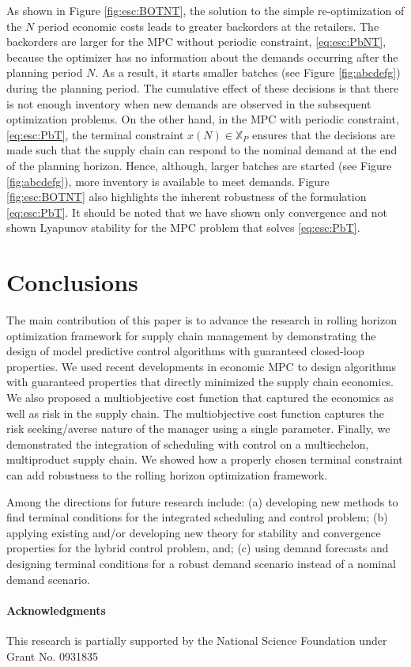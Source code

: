 \documentclass{elsarticle}
\theoremstyle{definition}
\begin{document}
As shown in 
Figure \ref{fig:esc:BOTNT}, the solution to the simple re-optimization
of the $N$ period economic 
costs leads to greater backorders at the retailers. The backorders are
larger for the MPC without periodic constraint, 
\eqref{eq:esc:PbNT}, because the optimizer has no information
about the demands occurring after the planning period $N$. As a
result, it starts smaller batches (see Figure \ref{fig:abcdefg})
during the planning period. The cumulative effect of these decisions
is that there is not enough inventory when new demands are observed in
the subsequent optimization problems. On the other hand, in the MPC
with periodic constraint, \eqref{eq:esc:PbT},  the terminal constraint
$x(N) \in 
\mathbb{X}_P$ ensures that the decisions are made such that the supply
chain can respond to the nominal demand at the end of the planning
horizon. Hence, although, larger batches are started (see Figure
\ref{fig:abcdefg}), more inventory is
available to meet demands. Figure \ref{fig:esc:BOTNT} also highlights
the inherent robustness of the formulation \eqref{eq:esc:PbT}. It should
be noted that we have shown only convergence and not shown Lyapunov
stability for the MPC problem that solves \eqref{eq:esc:PbT}.  

\section{Conclusions}
\label{sec:conclusions}
The main contribution of this paper is to advance the research in
rolling horizon optimization framework for supply chain management by
demonstrating the design of model predictive control algorithms with
guaranteed closed-loop properties. We used recent developments in
economic MPC to design algorithms with guaranteed properties that
directly minimized the supply chain economics. We also proposed a
multiobjective cost function that captured the economics as well as
risk in the supply chain. The multiobjective cost function captures
the risk seeking/averse nature of the manager using a single
parameter. Finally, we demonstrated the integration of scheduling with
control on a multiechelon, multiproduct supply chain. We showed how a
properly chosen terminal constraint can add robustness to the rolling
horizon optimization framework. 

Among the directions for future research include: (a) developing new methods to
find terminal conditions for the integrated scheduling and control
problem; (b) applying existing and/or developing  new theory
for stability and convergence properties for the hybrid control problem,
and; (c) using demand forecasts and designing terminal
conditions for a robust demand scenario instead of a nominal demand
scenario. 

\paragraph{Acknowledgments}
This research is partially supported by the National Science Foundation
under Grant No. 0931835



{\scriptsize
{}
}
\end{document}
